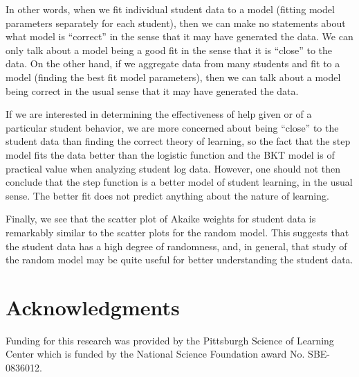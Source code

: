 \documentclass{edm_template}
\begin{document}
In other words, when we fit individual student data to a model (fitting
model parameters separately for each student), then we can make no
statements about what model is ``correct'' in the sense that it may
have generated the data.  We can only talk about a model being a good
fit in the sense that it is ``close'' to the data.
On the other hand, if we aggregate data from many students and fit to a
model (finding the best fit model parameters), then we can talk about
a model being correct in the usual sense that it may have generated
the data.  

If we are interested in determining the effectiveness
of help given or of a particular student behavior,
we are more concerned about being ``close'' to
the student data than finding the correct theory of learning, so the
fact that the step model fits the data better than the logistic function and
the BKT model is of practical value when analyzing student log data.  
However, one should not then conclude that the step function is a 
better model of student learning, in the usual sense.  The better fit does
not predict anything about the nature of learning.

Finally, we see that the scatter plot of Akaike weights for student
data is remarkably similar to the scatter plots for the random model.
This suggests that the student data has a high degree of randomness,
and, in general, that study of the random model may be quite useful for better
understanding the student data.

\section{Acknowledgments}

Funding for this research was provided by the Pittsburgh Science of
Learning Center which is funded by the National Science Foundation
award No. SBE-0836012. 


%
%

\end{document}
